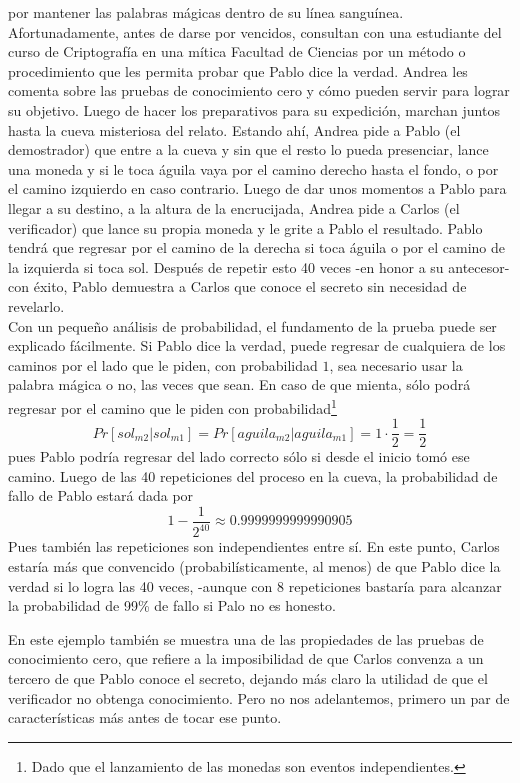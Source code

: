 \documentclass[oneside,10pt]{article}
\begin{document}
  por mantener las palabras mágicas dentro de su línea sanguínea. Afortunadamente, antes de darse por
  vencidos, consultan con una estudiante del curso de Criptografía en una mítica Facultad de
  Ciencias por
  un método o procedimiento que les permita probar que Pablo dice la verdad. Andrea les comenta sobre las pruebas de conocimiento cero y cómo pueden servir para lograr su objetivo. Luego de hacer los preparativos para su expedición, marchan juntos hasta la cueva misteriosa del relato.
  Estando ahí, Andrea pide a Pablo (el demostrador) que entre a la cueva y sin que el resto lo pueda presenciar, lance una moneda y si le toca águila vaya por el camino derecho hasta el fondo, o por el camino izquierdo
  en caso contrario. Luego de dar unos momentos a Pablo para llegar a su destino, a la altura de la encrucijada,  Andrea pide a Carlos (el verificador) que lance su propia moneda y le grite a Pablo el resultado. Pablo tendrá que regresar por el camino de la derecha si toca águila o por el camino de la izquierda si toca sol. Después de repetir esto 40 veces -en honor a su antecesor- con éxito, Pablo demuestra a Carlos que
  conoce el secreto sin necesidad de revelarlo.\\
  Con un pequeño análisis de probabilidad, el fundamento de la prueba puede ser explicado fácilmente.
  Si Pablo dice la verdad, puede regresar de cualquiera de los caminos por el lado que le piden, con probabilidad $1$, sea necesario usar la palabra mágica o no, las veces que sean. En caso de que mienta, sólo podrá regresar
  por el camino que le piden con probabilidad\footnote{Dado que el lanzamiento de las monedas son eventos independientes.}
  \begin{equation}
    Pr[sol_{m2}|sol_{m1}] = Pr[aguila_{m2}|aguila_{m1}] = 1 \cdot \frac{1}{2} = \frac{1}{2}
  \end{equation}
  pues Pablo podría regresar del lado correcto sólo si desde el inicio tomó ese camino. Luego de las
  40 repeticiones del proceso en la cueva, la probabilidad de fallo de Pablo estará dada por
  \begin{equation}
    1 - \frac{1}{2^{40}} \approx 0.9999999999990905
  \end{equation}
  Pues también las repeticiones son independientes entre sí. En este punto, Carlos estaría más que convencido (probabilísticamente, al menos) de que Pablo dice la verdad si lo logra las 40 veces, -aunque con 8 repeticiones bastaría para
  alcanzar la probabilidad de 99\% de fallo si Palo no es honesto.

  En este ejemplo también se muestra una de las propiedades de las pruebas de conocimiento cero, que
  refiere a la imposibilidad de que Carlos convenza a un tercero de que Pablo conoce el secreto,
  dejando más claro la utilidad de que el verificador no obtenga conocimiento. Pero no nos adelantemos, primero un par de características más antes de tocar
  ese punto. 
  
\end{document}
